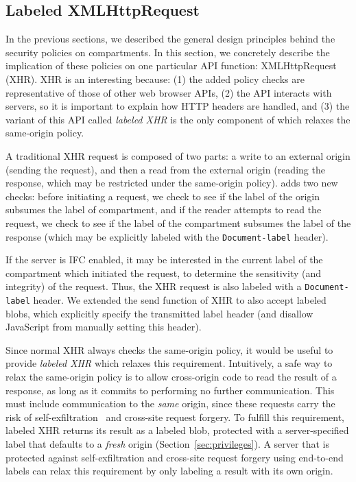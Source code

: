 \subsection{Labeled XMLHttpRequest}
\label{sec:labeled-xhr}

In the previous sections, we described the general design principles
behind the security policies on compartments.
%
In this section, we concretely describe the implication of these
policies on one particular API function: XMLHttpRequest (XHR).
%
XHR is an interesting because: (1) the added \sys{} policy checks are
representative of those of other web browser APIs, (2) the API
interacts with servers, so it is important to explain how HTTP headers are
handled, and (3) the variant of this API called \emph{labeled XHR} is
the only component of \sys{} which relaxes the same-origin policy.

A traditional XHR request is composed of two parts: a write to an
external origin (sending the request), and then a read from the external
origin (reading the response, which may be restricted under the
same-origin policy).
%
\sys{} adds two new checks: before initiating a
request, we check to see if the label of the origin subsumes the label
of compartment, and if the reader attempts to read the request, we check
to see if the label of the compartment subsumes the label of the response
(which may be explicitly labeled with the {\tt Document-label} header).

If the server is IFC enabled, it may be interested in the current label
of the compartment which initiated the request, to determine the
sensitivity (and integrity) of the request.
%
Thus, the XHR request is also labeled with a {\tt Document-label} header.
%
We extended the send function of XHR to also accept labeled blobs,
which explicitly specify the transmitted label header (and disallow
JavaScript from manually setting this header).

Since normal XHR always checks the same-origin policy, it would be
useful to provide \emph{labeled XHR} which relaxes this requirement.
%
Intuitively, a safe way to relax the same-origin policy is to allow
cross-origin code to read the result of a response, as long as it
commits to performing no further communication.
%
This must include communication to the \emph{same} origin, since these requests
carry the risk of self-exfiltration~ and cross-site request
forgery.
%
To fulfill this requirement, labeled XHR returns its result as a labeled
blob, protected with a server-specified label that defaults to a \emph{fresh}
origin (Section~\ref{sec:privileges}).
%
A server that is protected against self-exfiltration and cross-site
request forgery using end-to-end labels can relax this requirement by
only labeling a result with its own origin.

